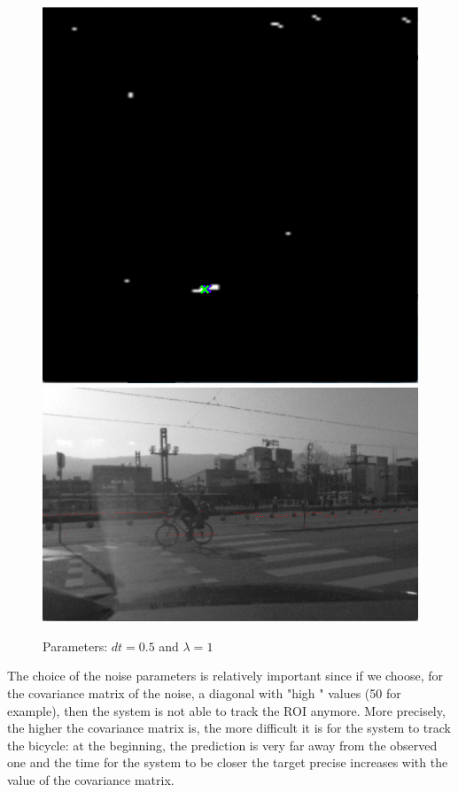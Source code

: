 \documentclass[a4paper,11pt]{article}
\begin{document}
\begin{figure}[H]
    \includegraphics[scale=0.3]{pic/tracking2.png}
    \includegraphics[scale=0.4]{pic/tracking2-left.png} \\
    \caption{Parameters: $ dt = 0.5 $ and $ \lambda = 1 $}
\end{figure}

The choice of the noise parameters is relatively important since if we choose,
for the covariance matrix of the noise, a diagonal with "high " values (50
for example), then the system is not able to track the ROI anymore. More precisely,
the higher the covariance matrix is, the more difficult it is for the system to
track the bicycle: at the beginning, the prediction is very far away from the
observed one and the time for the system to be closer the target precise
increases with the value of the covariance matrix.
\end{document}
